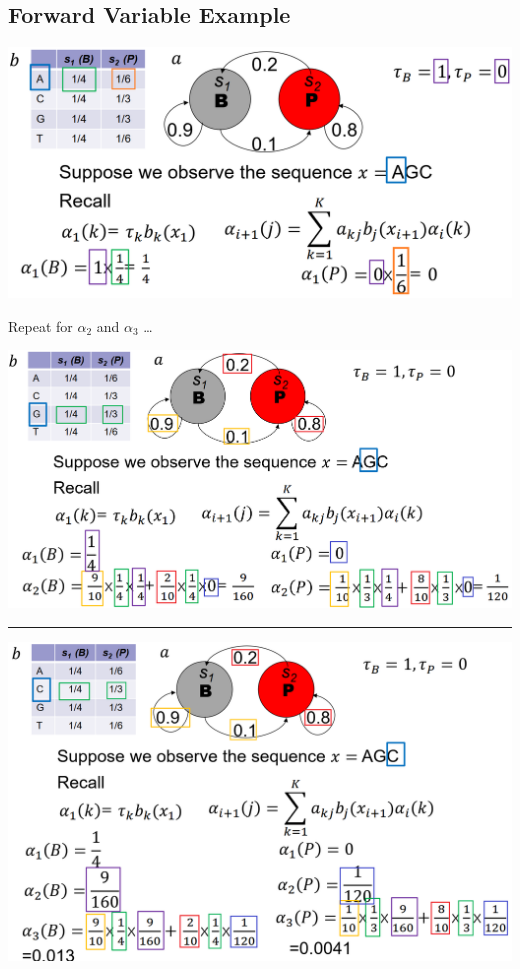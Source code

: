 \documentclass[10pt]{article}
\begin{document}
\subsection*{Forward Variable Example}
\begin{center} 
	\includegraphics*[width=\textwidth]{W9_14.png} 
\end{center}
Repeat for $\alpha_2$ and $\alpha_3$ \dots
\begin{center} 
	\includegraphics*[width=\textwidth]{W9_15.png} \\
    \rule{\textwidth}{2pt}
    \includegraphics*[width=\textwidth]{W9_16.png} \\
\end{center}
\end{document}
